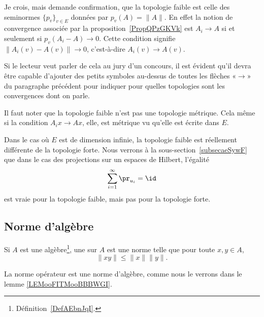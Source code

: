 \begin{probleme}
    Je crois, mais demande confirmation, que la topologie faible est celle des seminormes \( \{ p_v \}_{v\in E}\) données par \( p_v(A)=\| A \|\). En effet la notion de convergence associée par la proposition~\ref{PropQPzGKVk} est \( A_i\to A\) si et seulement si \( p_v(A_i-A)\to 0\). Cette condition signifie \( \| A_i(v)-A(v) \|\to 0\), c'est-à-dire \( A_i(v)\to A(v)\).

    Si le lecteur veut parler de cela au jury d'un concours, il est évident qu'il devra être capable d'ajouter des petits symboles au-dessus de toutes les flèches «\( \to\)» du paragraphe précédent pour indiquer pour quelles topologies sont les convergences dont on parle.
\end{probleme}

\begin{remark}
    Il faut noter que la topologie faible n'est pas une topologie métrique. Cela même si la condition \( A_ix\to Ax\), elle, est métrique vu qu'elle est écrite dans \( E\).

    Dans le cas où \( E\) est de dimension infinie, la topologie faible est réellement différente de la topologie forte. Nous verrons à la sous-section~\ref{subsecaeSywF} que dans le cas des projections sur un espaces de Hilbert, l'égalité
    \begin{equation}
        \sum_{i=1}^{\infty}\pr_{u_i}=\id
    \end{equation}
    est vraie pour la topologie faible, mais pas pour la topologie forte.
\end{remark}

\subsection{Norme d'algèbre}

\begin{definition}  \label{DefJWRWQue}
    Si \( A\) est une algèbre\footnote{Définition~\ref{DefAEbnJqI}.}, une  sur \( A\) est une norme telle que pour toute \( x,y\in A\),
    \begin{equation}
        \| xy \|\leq \| x \|\| y \|.
    \end{equation}
\end{definition}
La norme opérateur est une norme d'algèbre, comme nous le verrons dans le lemme \ref{LEMooFITMooBBBWGI}.

